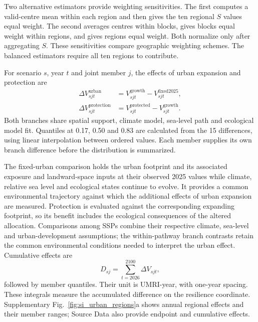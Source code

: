 Two alternative estimators provide weighting sensitivities. The first computes a valid-centre mean within each region and then gives the ten regional $S$ values equal weight. The second averages centres within blocks, gives blocks equal weight within regions, and gives regions equal weight. Both normalize only after aggregating $S$. These sensitivities compare geographic weighting schemes. The balanced estimators require all ten regions to contribute.

For scenario $s$, year $t$ and joint member $j$, the effects of urban expansion and protection are
\begin{align}
\Delta V^{\mathrm{urban}}_{sjt}&=V^{\mathrm{growth}}_{sjt}-V^{\mathrm{fixed2025}}_{sjt},\label{eq:si_urban_effect}\\
\Delta V^{\mathrm{protection}}_{sjt}&=V^{\mathrm{protected}}_{sjt}-V^{\mathrm{growth}}_{sjt}.\label{eq:si_protection_effect}
\end{align}
Both branches share spatial support, climate model, sea-level path and ecological model fit. Quantiles at 0.17, 0.50 and 0.83 are calculated from the 15 differences, using linear interpolation between ordered values. Each member supplies its own branch difference before the distribution is summarized.

The fixed-urban comparison holds the urban footprint and its associated exposure and landward-space inputs at their observed 2025 values while climate, relative sea level and ecological states continue to evolve. It provides a common environmental trajectory against which the additional effects of urban expansion are measured. Protection is evaluated against the corresponding expanding footprint, so its benefit includes the ecological consequences of the altered allocation. Comparisons among SSPs combine their respective climate, sea-level and urban-development assumptions; the within-pathway branch contrasts retain the common environmental conditions needed to interpret the urban effect. Cumulative effects are
\begin{equation}\label{eq:si_cumulative}
D_{sj}=\sum_{t=2026}^{2100}\Delta V_{sjt},
\end{equation}
followed by member quantiles. Their unit is UMRI-year, with one-year spacing. These integrals measure the accumulated difference on the resilience coordinate. Supplementary Fig.~\ref{fig:si_urban_regions}a shows annual regional effects and their member ranges; Source Data also provide endpoint and cumulative effects.

